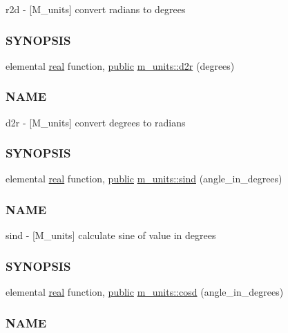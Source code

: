 \begin{DoxyCompactItemize}
\begin{DoxyCompactList}
r2d -\/ \mbox{[}M\+\_\+units\mbox{]} convert radians to degrees \subsubsection*{S\+Y\+N\+O\+P\+S\+IS}\end{DoxyCompactList}\item 
elemental \hyperlink{read__watch_83_8txt_abdb62bde002f38ef75f810d3a905a823}{real} function, \hyperlink{M__stopwatch_83_8txt_a2f74811300c361e53b430611a7d1769f}{public} \hyperlink{namespacem__units_a51fd676dee35aafbbd777cb88c347e23}{m\+\_\+units\+::d2r} (degrees)
\begin{DoxyCompactList}\small\item\em \subsubsection*{N\+A\+ME}

d2r -\/ \mbox{[}M\+\_\+units\mbox{]} convert degrees to radians \subsubsection*{S\+Y\+N\+O\+P\+S\+IS}\end{DoxyCompactList}\item 
elemental \hyperlink{read__watch_83_8txt_abdb62bde002f38ef75f810d3a905a823}{real} function, \hyperlink{M__stopwatch_83_8txt_a2f74811300c361e53b430611a7d1769f}{public} \hyperlink{namespacem__units_afe7f79e1832a71630c0f83602a309aef}{m\+\_\+units\+::sind} (angle\+\_\+in\+\_\+degrees)
\begin{DoxyCompactList}\small\item\em \subsubsection*{N\+A\+ME}

sind -\/ \mbox{[}M\+\_\+units\mbox{]} calculate sine of value in degrees \subsubsection*{S\+Y\+N\+O\+P\+S\+IS}\end{DoxyCompactList}\item 
elemental \hyperlink{read__watch_83_8txt_abdb62bde002f38ef75f810d3a905a823}{real} function, \hyperlink{M__stopwatch_83_8txt_a2f74811300c361e53b430611a7d1769f}{public} \hyperlink{namespacem__units_ac02800d0ec7fcffc2fdb2a2216770678}{m\+\_\+units\+::cosd} (angle\+\_\+in\+\_\+degrees)
\begin{DoxyCompactList}\small\item\em \subsubsection*{N\+A\+ME}


\end{DoxyCompactList}
\end{DoxyCompactItemize}
